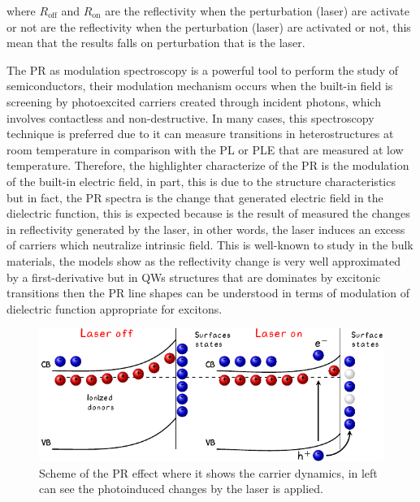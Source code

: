 where $R_{\mathrm{off}}$ and $R_{\mathrm{on}}$ are the reflectivity when the perturbation (laser) are activate or not  are the reflectivity when the perturbation (laser) are activated or not, this mean that the results  falls on perturbation that is the laser.

The PR as modulation spectroscopy is a powerful tool to perform the study of semiconductors, their modulation mechanism occurs when the built-in field is screening by photoexcited carriers created through incident photons, which involves contactless and non-destructive.  In many cases, this spectroscopy technique is preferred due to it can measure transitions in heterostructures at room temperature in comparison with the PL or PLE\cite{shanabrook1987photoreflectance} that are measured at low temperature. Therefore, the highlighter characterize of the PR is the modulation of the built-in electric field, in part, this is due to the structure characteristics but in fact, the PR spectra is the change that generated electric field in the dielectric function, this is expected because is the result of measured the changes in reflectivity generated by the laser, in other words, the laser induces an excess of carriers which neutralize intrinsic field. This is well-known to study in the bulk materials, the models show as the reflectivity change is very well approximated by a first-derivative\cite{seraphin1972electric,aspnes1973surface,misiewicz1999photoreflectance,sydor1989photoreflectanceinterfaces}  but in QWs structures that are dominates by excitonic transitions then the PR line shapes can be understood in terms of modulation of dielectric function appropriate for excitons\cite{shanabrook1987photoreflectance,theis1988excitonic,theis1989extrinsic,gontijo1994photoreflectance}. 

\begin{figure}[ht!]
	\centering
	\includegraphics[width=\textwidth]{../figures/chapter-3/pr-modulation/build/pr-modulation.pdf}
	\caption{Scheme of the PR effect where it shows the carrier dynamics, in left can see the photoinduced changes by the laser is applied.}
	\label{fig:chapter-3-PR-MODULATION-MECHANISM}
\end{figure}


